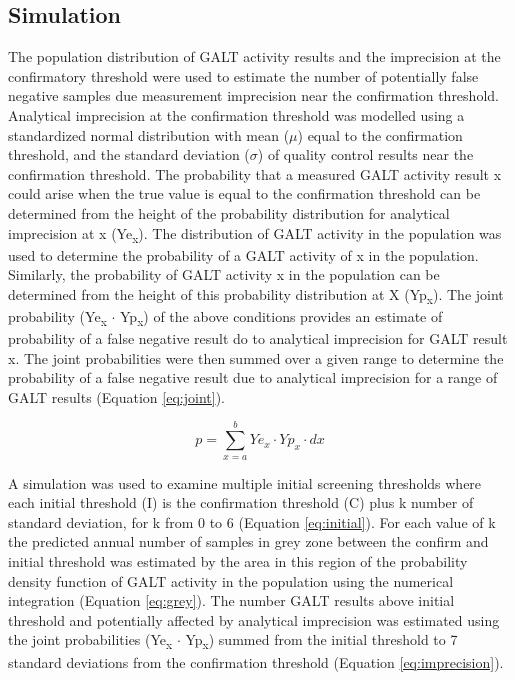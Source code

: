 \documentclass[review]{elsarticle}
\begin{document}
\subsection*{Simulation}
\label{sec:org1148431}
The population distribution of GALT activity results and the
imprecision at the confirmatory threshold were used to estimate the
number of potentially false negative samples due measurement
imprecision near the confirmation threshold. Analytical imprecision at
the confirmation threshold was modelled using a standardized normal
distribution with mean (\(\mu\)) equal to the confirmation threshold, and
the standard deviation (\(\sigma\)) of quality control results near the
confirmation threshold. The probability that a measured GALT activity
result x could arise when the true value is equal to the confirmation
threshold can be determined from the height of the probability
distribution for analytical imprecision at x (Ye\textsubscript{x}). The distribution
of GALT activity in the population was used to determine the
probability of a GALT activity of x in the population. Similarly, the
probability of GALT activity x in the population can be determined
from the height of this probability distribution at X (Yp\textsubscript{x}). The
joint probability (Ye\textsubscript{x} \(\cdot\) Yp\textsubscript{x}) of the above conditions provides
an estimate of probability of a false negative result do to analytical
imprecision for GALT result x. The joint probabilities were then
summed over a given range to determine the probability of a false
negative result due to analytical imprecision for a range of GALT
results (Equation \ref{eq:joint}).


\begin{equation}\label{eq:joint}
p = \sum_{x=a}^b Ye_x \cdot Yp_x \cdot dx
\end{equation}

A simulation was used to examine multiple initial screening thresholds
where each initial threshold (I) is the confirmation threshold (C)
plus k number of standard deviation, for k from 0 to 6 (Equation
\ref{eq:initial}). For each value of k the predicted annual number of
samples in grey zone between the confirm and initial threshold was
estimated by the area in this region of the probability density
function of GALT activity in the population using the numerical
integration (Equation \ref{eq:grey}). The number GALT results above
initial threshold and potentially affected by analytical imprecision
was estimated using the joint probabilities (Ye\textsubscript{x} \(\cdot\) Yp\textsubscript{x}) summed from
the initial threshold to 7 standard deviations from the confirmation
threshold (Equation \ref{eq:imprecision}).
\end{document}
